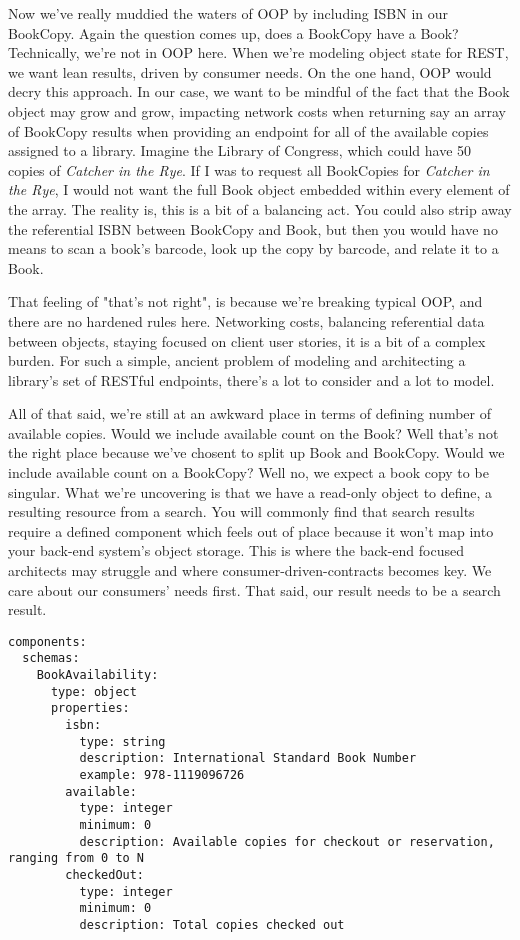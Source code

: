Now we've really muddied the waters of OOP by including ISBN in our BookCopy.  Again the question comes up, does a BookCopy have a Book?  Technically, we're not in OOP here.  When we're modeling object state for REST, we want lean results, driven by consumer needs.  On the one hand, OOP would decry this approach.  In our case, we want to be mindful of the fact that the Book object may grow and grow, impacting network costs when returning say an array of BookCopy results when providing an endpoint for all of the available copies assigned to a library.  Imagine the Library of Congress, which could have 50 copies of \textit{Catcher in the Rye}.  If I was to request all BookCopies for \textit{Catcher in the Rye}, I would not want the full Book object embedded within every element of the array.  The reality is, this is a bit of a balancing act.  You could also strip away the referential ISBN between BookCopy and Book, but then you would have no means to scan a book's barcode, look up the copy by barcode, and relate it to a Book.

That feeling of "that's not right", is because we're breaking typical OOP, and there are no hardened rules here.  Networking costs, balancing referential data between objects, staying focused on client user stories, it is a bit of a complex burden.  For such a simple, ancient problem of modeling and architecting a library's set of RESTful endpoints, there's a lot to consider and a lot to model.

All of that said, we're still at an awkward place in terms of defining number of available copies.  Would we include available count on the Book?  Well that's not the right place because we've chosent to split up Book and BookCopy.  Would we include available count on a BookCopy?  Well no, we expect a book copy to be singular.  What we're uncovering is that we have a read-only object to define, a resulting resource from a search.  You will commonly find that search results require a defined component which feels out of place because it won't map into your back-end system's object storage.  This is where the back-end focused architects may struggle and where consumer-driven-contracts becomes key.  We care about our consumers' needs first.  That said, our result needs to be a search result.

\begin{minipage}{\linewidth}
\begin{code}
\begin{lstlisting}[belowskip=-\baselineskip]
components:
  schemas:
    BookAvailability:
      type: object
      properties:
        isbn:
          type: string
          description: International Standard Book Number
          example: 978-1119096726
        available:
          type: integer
          minimum: 0
          description: Available copies for checkout or reservation, ranging from 0 to N
        checkedOut:
          type: integer
          minimum: 0
          description: Total copies checked out
\end{lstlisting}
\end{code}
\end{minipage}

